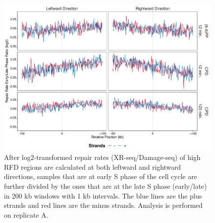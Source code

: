 \begin{figure}[H]
\begin{center}
\includegraphics[width=\textwidth]{Chapters/7_appendix/figures/supfig70}
\caption[Repair rate early/late ratio of high RFDs in 200 kb (replicate A).]{After log2-transformed repair rates (XR-seq/Damage-seq) of high RFD regions are calculated at both leftward and rightward directions, samples that are at early S phase of the cell cycle are further divided by the ones that are at the late S phase (early/late) in 200 kb windows with 1 kb intervals. The blue lines are the plus strands and red lines are the minus strands. Analysis is performed on replicate A.}
\label{supfig:rrel200rfdA}
\end{center}
\end{figure}

